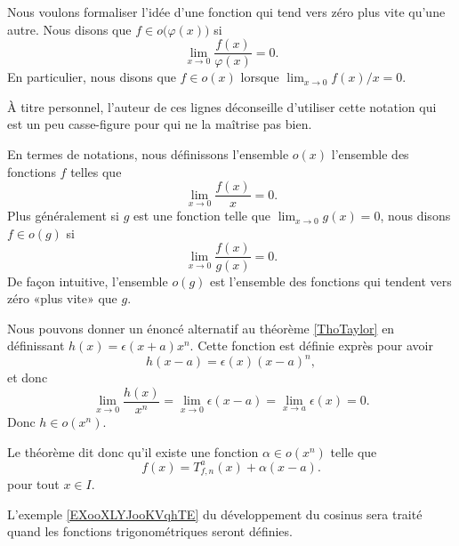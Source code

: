 Nous voulons formaliser l'idée d'une fonction qui tend vers zéro \og plus vite\fg{} qu'une autre. Nous disons que $f\in o\big(\varphi(x)\big)$ si
\begin{equation}
    \lim_{x\to 0} \frac{ f(x) }{ \varphi(x) }=0.
\end{equation}
En particulier, nous disons que $f\in o(x)$ lorsque $\lim_{x\to 0} f(x)/x=0$.

\begin{remark}
    À titre personnel, l'auteur de ces lignes déconseille d'utiliser cette notation qui est un peu casse-figure pour qui ne la maîtrise pas bien.
\end{remark}

En termes de notations, nous définissons l'ensemble $o(x)$ l'ensemble des fonctions $f$ telles que
\begin{equation}
	\lim_{x\to 0} \frac{ f(x) }{ x }=0.
\end{equation}
Plus généralement si $g$ est une fonction telle que $\lim_{x\to 0} g(x)=0$, nous disons $f\in o(g)$ si
\begin{equation}
	\lim_{x\to 0} \frac{ f(x) }{ g(x) }=0.
\end{equation}
De façon intuitive, l'ensemble $o(g)$ est l'ensemble des fonctions qui tendent vers zéro «plus vite» que $g$.

Nous pouvons donner un énoncé alternatif au théorème \ref{ThoTaylor} en définissant $h(x)=\epsilon(x+a)x^n$. Cette fonction est définie exprès pour avoir
\begin{equation}
	h(x-a)=\epsilon(x)(x-a)^n,
\end{equation}
et donc
\begin{equation}
	\lim_{x\to 0} \frac{ h(x) }{ x^n }=\lim_{x\to 0} \epsilon(x-a)=\lim_{x\to a}\epsilon(x)=0. 
\end{equation}
Donc $h\in o(x^n)$.

Le théorème dit donc qu'il existe une fonction $\alpha\in o(x^n)$ telle que
\begin{equation}
	f(x)=T^a_{f,n}(x)+\alpha(x-a).
\end{equation}
pour tout $x\in I$. 

\begin{example}
    L'exemple \ref{EXooXLYJooKVqhTE} du développement du cosinus sera traité quand les fonctions trigonométriques seront définies.
\end{example}

